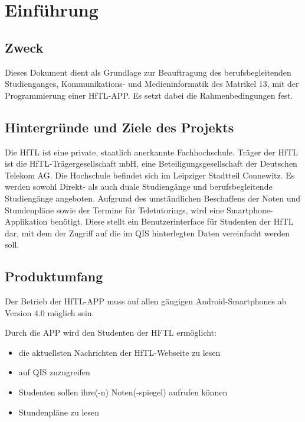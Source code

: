
\section{Einführung}

\subsection{\textbf{Zweck}}
Dieses Dokument dient als Grundlage zur Beauftragung des berufsbegleitenden Studienganges, Kommunikations- und Medieninformatik des Matrikel 13, mit der Programmierung einer \acs{HfTL}-\acs{APP}. Es setzt dabei die Rahmenbedingungen fest.

\subsection{\textbf{Hintergründe und Ziele des Projekts}}
Die \acf{HfTL} ist eine private, staatlich anerkannte Fachhochschule. Träger der \ac{HfTL} ist die \ac{HfTL}-Trägergesellschaft \acs{mbH}, eine Beteiligungsgesellschaft der Deutschen Telekom AG. Die Hochschule befindet sich im Leipziger Stadtteil Connewitz. Es werden sowohl Direkt- als auch duale Studiengänge und berufsbegleitende Studiengänge angeboten.
Aufgrund des umständlichen Beschaffens der Noten und Stundenpläne sowie der Termine für Teletutorings, wird eine Smartphone-Applikation benötigt. Diese stellt ein Benutzerinterface für Studenten der \acs{HfTL} dar, mit dem der Zugriff auf die im \acs{QIS} hinterlegten Daten vereinfacht werden soll.

\subsection{\textbf{Produktumfang}}

Der Betrieb der \acs{HfTL}-APP muss auf allen gängigen Android-Smartphones ab Version 4.0 möglich sein.

Durch die APP wird den Studenten der HFTL ermöglicht: 

\begin{itemize}
      \item die aktuellsten Nachrichten der \acs{HfTL}-Webseite zu lesen
      \item auf \acs{QIS} zuzugreifen
      \item Studenten sollen ihre(-n) Noten(-spiegel) aufrufen können
      \item Stundenpläne zu lesen
\end{itemize}
   
